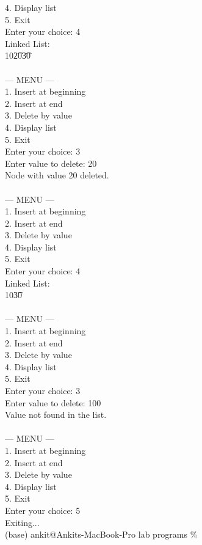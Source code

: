 \documentclass[12pt,a4paper]{article}
\begin{document}
\begin{tcolorbox}[terminalstyle, title=Sample Output]
{4. Display list\\
5. Exit\\
Enter your choice: 4\\
Linked List:\\
10\t20\t30\tNULL\\
\\
--- MENU ---\\
1. Insert at beginning\\
2. Insert at end\\
3. Delete by value\\
4. Display list\\
5. Exit\\
Enter your choice: 3\\
Enter value to delete: 20\\
Node with value 20 deleted.\\
\\
--- MENU ---\\
1. Insert at beginning\\
2. Insert at end\\
3. Delete by value\\
4. Display list\\
5. Exit\\
Enter your choice: 4\\
Linked List:\\
10\t30\tNULL\\
\\
--- MENU ---\\
1. Insert at beginning\\
2. Insert at end\\
3. Delete by value\\
4. Display list\\
5. Exit\\
Enter your choice: 3\\
Enter value to delete: 100\\
Value not found in the list.\\
\\
--- MENU ---\\
1. Insert at beginning\\
2. Insert at end\\
3. Delete by value\\
4. Display list\\
5. Exit\\
Enter your choice: 5\\
Exiting...\\
(base) ankit@Ankits-MacBook-Pro lab programs \%
}
\end{tcolorbox}
\end{document}
